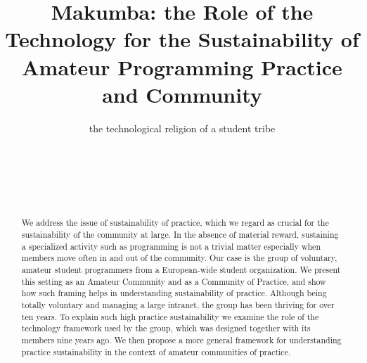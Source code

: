 \documentclass{acm_proc_article-sp}
\begin{document}
\title{Makumba: the Role of the Technology for the Sustainability of Amateur Programming Practice and Community}
\subtitle{the technological religion of a student tribe}


\author{
\alignauthor
\hspace{10mm} \\
       \affaddr{\hspace{10mm} }\\
       \affaddr{\hspace{10mm} }\\
       \affaddr{\hspace{10mm} }\\
       \email{\hspace{10mm} }
}

\maketitle
\begin{abstract}
We address the issue of sustainability of practice, which we regard as crucial for the sustainability of the community at large. In the absence of material reward, sustaining a specialized activity such as programming is not a trivial matter especially when members move often in and out of the community. Our case is the group of voluntary, amateur student programmers from a European-wide student organization. We present this setting as an Amateur Community and as a Community of Practice, and show how such framing helps in understanding sustainability of practice. Although being totally voluntary and managing a large intranet, the group has been thriving for over ten years. To explain such high practice sustainability we examine the role of the technology framework used by the group, which was designed together with its members nine years ago. We then propose a more general framework for understanding practice sustainability in the context of amateur communities of practice. 
\end{abstract}
\end{document}
